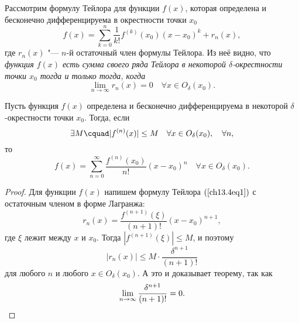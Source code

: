 Рассмотрим формулу Тейлора для функции $f(x)$, которая определена и бесконечно дифференцируема в окрестности точки $x_0$
\begin{equation} \label{ch13.4eq1}
f(x) = \sum\limits_{k = 0}^{n} \frac{1}{k!}f^{(k)}(x_0)(x - x_0)^k + r_n(x),
\end{equation}
где $r_n(x)$ "--- $n$-й остаточный член формулы Тейлора. Из неё видно, что \textit{функция $f(x)$ есть сумма своего ряда Тейлора в некоторой $\delta$-окрестности точки $x_0$ тогда и только тогда, когда}
$$
\lim\limits_{n \to \infty} r_n(x) = 0 \quad \forall x \in O_\delta(x_0).
$$
\begin{thm}
Пусть функция $f(x)$ определена и бесконечно дифференцируема в некоторой $\delta$-окрестности точки $x_0$. Тогда, если
$$
\exists M\cquad |f^{(n)}(x)| \le M \quad \forall x \in O_\delta(x_0), \quad \forall n,
$$ 
то
$$
f(x) = \sum\limits_{n = 0}^{\infty} \frac{f^{(n)}(x_0)}{n!}(x - x_0)^n \quad \forall x \in O_\delta(x_0).
$$
\end{thm}
\begin{proof}
Для функции $f(x)$ напишем формулу Тейлора $(\ref{ch13.4eq1})$ с остаточным членом в форме Лагранжа:
$$
r_n(x) = \frac{f^{(n+1)}(\xi)}{(n + 1)!} (x - x_0)^{n + 1},
$$
где $\xi$ лежит между $x$ и $x_0$. Тогда $|f^{(n+1)}(\xi)| \le M$, и поэтому
$$
|r_n(x)| \le M \cdot \frac{\delta^{n + 1}}{(n + 1)!}
$$
для любого $n$ и любого $x \in O_\delta(x_0)$. А это и доказывает теорему, так как
\begin{equation*}
\lim\limits_{n \to \infty} \frac{\delta^{n + 1}}{(n + 1)!} = 0. \qedhere
\end{equation*}
\end{proof}